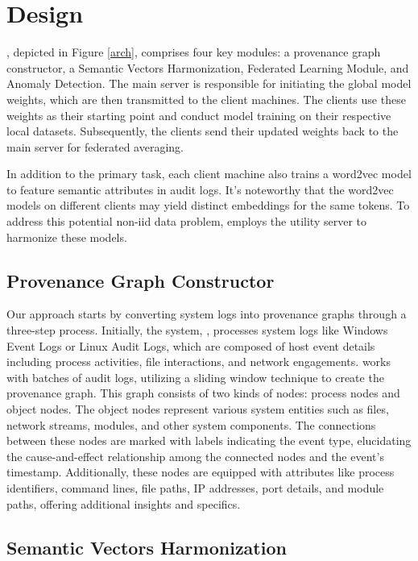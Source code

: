 \section{\Sys Design}
\label{sec:methodology}

\Sys, depicted in Figure \ref{arch}, comprises four key modules: a provenance graph constructor, a Semantic Vectors Harmonization, Federated Learning Module, and Anomaly Detection. The main server is responsible for initiating the global model weights, which are then transmitted to the client machines. The clients use these weights as their starting point and conduct model training on their respective local datasets. Subsequently, the clients send their updated weights back to the main server for federated averaging.

In addition to the primary task, each client machine also trains a word2vec model to feature semantic attributes in audit logs. It's noteworthy that the word2vec models on different clients may yield distinct embeddings for the same tokens. To address this potential non-iid data problem, \Sys employs the utility server to harmonize these models.

\subsection{Provenance Graph Constructor}
Our approach starts by converting system logs into provenance graphs through a three-step process. Initially, the system, \Sys, processes system logs like Windows Event Logs or Linux Audit Logs, which are composed of host event details including process activities, file interactions, and network engagements. \Sys works with batches of audit logs, utilizing a sliding window technique to create the provenance graph. This graph consists of two kinds of nodes: process nodes and object nodes. The object nodes represent various system entities such as files, network streams, modules, and other system components. The connections between these nodes are marked with labels indicating the event type, elucidating the cause-and-effect relationship among the connected nodes and the event's timestamp. Additionally, these nodes are equipped with attributes like process identifiers, command lines, file paths, IP addresses, port details, and module paths, offering additional insights and specifics.

\subsection{Semantic Vectors Harmonization}

